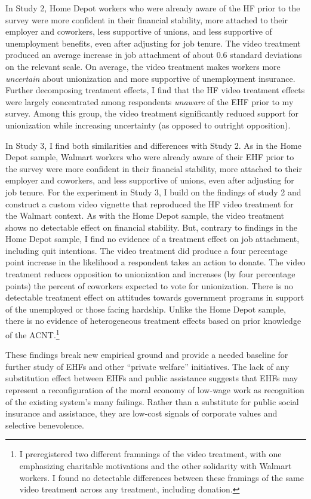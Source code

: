 \documentclass[
  11pt,
  oneside]{article}
\begin{document}
In Study 2, Home Depot workers who were already aware of the HF prior to the survey were more confident in their financial stability, more attached to their employer and coworkers, less supportive of unions, and less supportive of unemployment benefits, even after adjusting for job tenure. The video treatment produced an average increase in job attachment of about 0.6 standard deviations on the relevant scale. On average, the video treatment makes workers more \emph{uncertain} about unionization and more supportive of unemployment insurance. Further decomposing treatment effects, I find that the HF video treatment effects were largely concentrated among respondents \emph{unaware} of the EHF prior to my survey. Among this group, the video treatment significantly reduced support for unionization while increasing uncertainty (as opposed to outright opposition).

In Study 3, I find both similarities and differences with Study 2. As in the Home Depot sample, Walmart workers who were already aware of their EHF prior to the survey were more confident in their financial stability, more attached to their employer and coworkers, and less supportive of unions, even after adjusting for job tenure. For the experiment in Study 3, I build on the findings of study 2 and construct a custom video vignette that reproduced the HF video treatment for the Walmart context. As with the Home Depot sample, the video treatment shows no detectable effect on financial stability. But, contrary to findings in the Home Depot sample, I find no evidence of a treatment effect on job attachment, including quit intentions. The video treatment did produce a four percentage point increase in the likelihood a respondent takes an action to donate. The video treatment reduces opposition to unionization and increases (by four percentage points) the percent of coworkers expected to vote for unionization. There is no detectable treatment effect on attitudes towards government programs in support of the unemployed or those facing hardship. Unlike the Home Depot sample, there is no evidence of heterogeneous treatment effects based on prior knowledge of the ACNT.\footnote{I preregistered two different framnings of the video treatment, with one emphasizing charitable motivations and the other solidarity with Walmart workers. I found no detectable differences between these framings of the same video treatment across any treatment, including donation.}

These findings break new empirical ground and provide a needed baseline for further study of EHFs and other ``private welfare'' initiatives. The lack of any substitution effect between EHFs and public assistance suggests that EHFs may represent a reconfiguration of the moral economy of low-wage work as recognition of the existing system's many failings. Rather than a substitute for public social insurance and assistance, they are low-cost signals of corporate values and selective benevolence.
\end{document}
